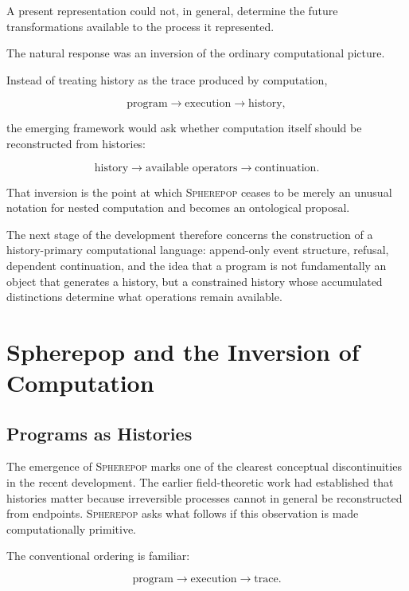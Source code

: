 \documentclass[11pt]{article}
\theoremstyle{remark}
\newcommand{\Spherepop}{\textsc{Spherepop}}
\begin{document}
A present representation could not, in general, determine the future transformations available to the process it represented.

The natural response was an inversion of the ordinary computational picture.

Instead of treating history as the trace produced by computation,

\begin{equation}
\text{program}
\longrightarrow
\text{execution}
\longrightarrow
\text{history},
\end{equation}

the emerging framework would ask whether computation itself should be reconstructed from histories:

\begin{equation}
\text{history}
\longrightarrow
\text{available operators}
\longrightarrow
\text{continuation}.
\end{equation}

That inversion is the point at which \Spherepop{} ceases to be merely an unusual notation for nested computation and becomes an ontological proposal.

The next stage of the development therefore concerns the construction of a history-primary computational language: append-only event structure, refusal, dependent continuation, and the idea that a program is not fundamentally an object that generates a history, but a constrained history whose accumulated distinctions determine what operations remain available.

\section{Spherepop and the Inversion of Computation}

\subsection{Programs as Histories}

The emergence of \Spherepop{} marks one of the clearest conceptual discontinuities in the recent development. The earlier field-theoretic work had established that histories matter because irreversible processes cannot in general be reconstructed from endpoints. \Spherepop{} asks what follows if this observation is made computationally primitive.

The conventional ordering is familiar:

\begin{equation}
\text{program}
\longrightarrow
\text{execution}
\longrightarrow
\text{trace}.
\end{equation}
\end{document}

